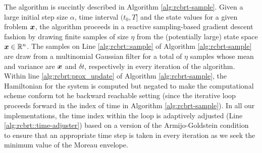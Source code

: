 The algorithm is succintly described in Algorithm \autoref{alg:rcbrt-sample}. Given a large initial step size $\alpha$, time interval $(t_0, T]$ and the state values for a given froblem $\bm{x}$, the algorithm proceeds in a reactive sampling-based gradient descent fashion by drawing finite samples of size $\eta$ from the (potentially large) state space $\bm{x} \in \mathbb{R}^n$. The samples on Line \ref{alg:rcbrt::sample} of Algorithm \autoref{alg:rcbrt-sample} are draw from a multinomial Gaussian filter for a total of $\eta$ samples whose  mean and variance are $\bm{x}$ and $\delta t$, respectively in every iteration of the algorithm. Within line \ref{alg:rcbrt:prox_update} of Algorithm \autoref{alg:rcbrt-sample}, the Hamiltonian for the system is computed but negated to make the computational scheme conform tot he backward reachable setting (since the iterative loop proceeds forward in the index of time in Algorithm \autoref{alg:rcbrt-sample}). In all our implementations, the time index within the loop is adaptively adjusted (\ie Line \ref{alg:rcbrt::time-adjuster}) based on a version of the Armijo-Goldstein condition~\citet{Armijo1966minimization} to ensure that an appropriate time step is taken in every iteration as we seek the minimum value of the Moreau envelope.

